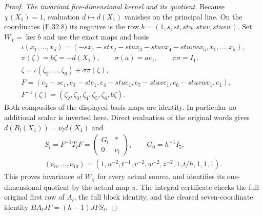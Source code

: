 \begin{proof}
\emph{The invariant five-dimensional kernel and its quotient.}
Because $\chi(X_1)=1$, evaluation
$d\mapsto d(X_1)$ vanishes on the
principal line. On the coordinates
(F.32.8) its negative is the row
$b=(1,s,st,stu,stuv,stuvw)$.
Set $W_\chi=\ker b$ and use the exact
maps and basis
\[
 \begin{gathered}
 \iota(x_1,\ldots,x_5)=
 (-sx_1-stx_2-stux_3-stuvx_4-stuvwx_5,x_1,\ldots,x_5),\\
 \pi(\zeta)=b\zeta=-d(X_1),\qquad \sigma(a)=ae_1,\qquad
 \pi\sigma=I_1,\\
 \zeta=\iota(\zeta_2,\ldots,\zeta_6)+\sigma\pi(\zeta),\\
 F=(e_2-se_1,e_3-ste_1,e_4-stue_1,
                         e_5-stuve_1,e_6-stuvwe_1,e_1),\\
 F^{-1}(\zeta)=(\zeta_2,\zeta_3,\zeta_4,\zeta_5,\zeta_6,b\zeta).
 \end{gathered}                                                \tag{F.32.11}
\]
Both composites of the displayed basis
maps are identity. In particular no
additional scalar is inverted here.
Direct evaluation of the original words
gives $d(B_l(X_1))=\nu_l d(X_1)$ and
\[
 \begin{gathered}
 S_l=F^{-1}T_lF=
       \begin{pmatrix}G_l&*\\0&\nu_l\end{pmatrix},\qquad
                              G_0=h^{-1}I_5,\\
 (\nu_0,\ldots,\nu_{10})=
 (1,u^{-2},t^{-1},v^{-2},w^{-2},z^{-2},1,t/h,1,1,1).
 \end{gathered}                                                \tag{F.32.12}
\]
This proves invariance of $W_\chi$
for every actual source, and identifies
its one-dimensional quotient by the
actual map $\pi$.
The integral certificate checks the
full original first row of $A_l$,
the full block identity, and the cleared
seven-coordinate identity
$BA_lJF=(h-1)JFS_l$.


\end{proof}
